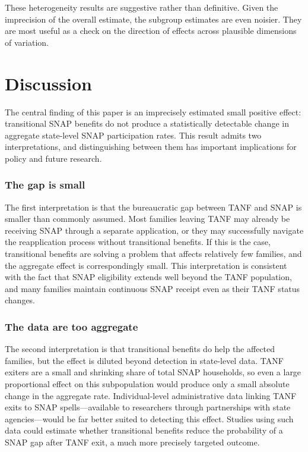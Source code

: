 \documentclass[12pt]{article}
\begin{document}
These heterogeneity results are suggestive rather than definitive. Given the imprecision of the overall estimate, the subgroup estimates are even noisier. They are most useful as a check on the direction of effects across plausible dimensions of variation.


\section{Discussion}

The central finding of this paper is an imprecisely estimated small positive effect: transitional SNAP benefits do not produce a statistically detectable change in aggregate state-level SNAP participation rates. This result admits two interpretations, and distinguishing between them has important implications for policy and future research.

\subsubsection*{The gap is small} The first interpretation is that the bureaucratic gap between TANF and SNAP is smaller than commonly assumed. Most families leaving TANF may already be receiving SNAP through a separate application, or they may successfully navigate the reapplication process without transitional benefits. If this is the case, transitional benefits are solving a problem that affects relatively few families, and the aggregate effect is correspondingly small. This interpretation is consistent with the fact that SNAP eligibility extends well beyond the TANF population, and many families maintain continuous SNAP receipt even as their TANF status changes.

\subsubsection*{The data are too aggregate} The second interpretation is that transitional benefits do help the affected families, but the effect is diluted beyond detection in state-level data. TANF exiters are a small and shrinking share of total SNAP households, so even a large proportional effect on this subpopulation would produce only a small absolute change in the aggregate rate. Individual-level administrative data linking TANF exits to SNAP spells---available to researchers through partnerships with state agencies---would be far better suited to detecting this effect. Studies using such data could estimate whether transitional benefits reduce the probability of a SNAP gap after TANF exit, a much more precisely targeted outcome.
\end{document}
